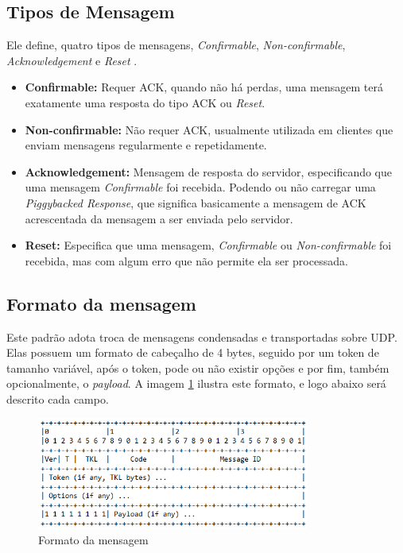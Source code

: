 \subsection{Tipos de Mensagem}
\label{subsection:msg_piggybacked}
Ele define, quatro tipos de mensagens, \textit{Confirmable}, \textit{Non-confirmable}, \textit{Acknowledgement} e \textit{Reset} \cite{rfc7252_CoAP}.

\begin{itemize}
	\item \textbf{Confirmable:} Requer ACK, quando não há perdas, uma mensagem terá exatamente uma resposta do tipo ACK ou \textit{Reset}.
	\item \textbf{Non-confirmable:} Não requer ACK, usualmente utilizada em clientes que enviam mensagens regularmente e repetidamente.
	\item \textbf{Acknowledgement:} Mensagem de resposta do servidor, especificando que uma mensagem \textit{Confirmable} foi recebida. Podendo ou não carregar uma \textit{Piggybacked Response}, que significa basicamente a mensagem de ACK acrescentada da mensagem a ser enviada pelo servidor.
	\item \textbf{Reset:} Especifica que uma mensagem, \textit{Confirmable} ou \textit{Non-confirmable} foi recebida, mas com algum erro que não permite ela ser processada.		
\end{itemize}

\subsection{Formato da mensagem}

Este padrão adota troca de mensagens condensadas e transportadas sobre UDP. Elas possuem um formato de cabeçalho de 4 bytes, seguido por um token de tamanho variável, após o token, pode ou não existir opções e por fim, também opcionalmente, o \textit{payload}. A imagem \ref{fig:message_format} ilustra este formato, e logo abaixo será descrito cada campo.
%
\begin{figure}[!htb]
	\centering
	\includegraphics[width=0.8\textwidth]{MESSAGE_FORMAT}
	\caption{Formato da mensagem}
	\label{fig:message_format}
\end{figure}
%

